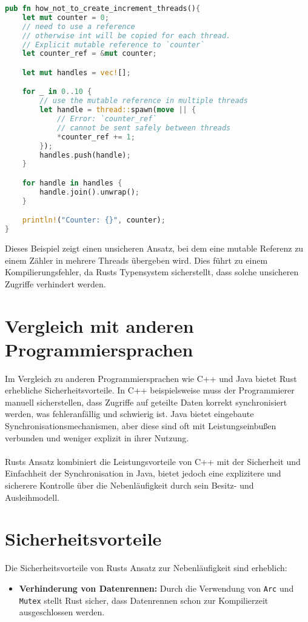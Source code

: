 \begin{lstlisting}[language=Rust, caption=Unsicheres Erstellen von Threads]
pub fn how_not_to_create_increment_threads(){
    let mut counter = 0;
    // need to use a reference 
    // otherwise int will be copied for each thread.
    // Explicit mutable reference to `counter`
    let counter_ref = &mut counter; 

    let mut handles = vec![];

    for _ in 0..10 {
        // use the mutable reference in multiple threads
        let handle = thread::spawn(move || {
            // Error: `counter_ref` 
            // cannot be sent safely between threads
            *counter_ref += 1; 
        });
        handles.push(handle);
    }

    for handle in handles {
        handle.join().unwrap();
    }

    println!("Counter: {}", counter);
}
\end{lstlisting}
\noindent
Dieses Beispiel zeigt einen unsicheren Ansatz, bei dem eine mutable Referenz zu einem Zähler in mehrere Threads übergeben wird. 
Dies führt zu einem Kompilierungsfehler, da Rusts Typensystem sicherstellt, dass solche unsicheren Zugriffe verhindert werden.

\section{Vergleich mit anderen Programmiersprachen}

Im Vergleich zu anderen Programmiersprachen wie C++ und Java bietet Rust erhebliche Sicherheitsvorteile. 
In C++ beispielsweise muss der Programmierer manuell sicherstellen, dass Zugriffe auf geteilte Daten korrekt synchronisiert werden, was fehleranfällig und schwierig ist. 
Java bietet eingebaute Synchronisationsmechanismen, aber diese sind oft mit Leistungseinbußen verbunden und weniger explizit in ihrer Nutzung.\\
\\
Rusts Ansatz kombiniert die Leistungsvorteile von C++ mit der Sicherheit und Einfachheit der Synchronisation in Java, bietet jedoch eine explizitere und sicherere Kontrolle über die Nebenläufigkeit durch sein Besitz- und Ausleihmodell.

\section{Sicherheitsvorteile}

Die Sicherheitsvorteile von Rusts Ansatz zur Nebenläufigkeit sind erheblich:

\begin{itemize}
\item \textbf{Verhinderung von Datenrennen:} Durch die Verwendung von \texttt{Arc} und \texttt{Mutex} stellt Rust sicher, dass Datenrennen schon zur Kompilierzeit ausgeschlossen werden.
\end{itemize}
\noindent

